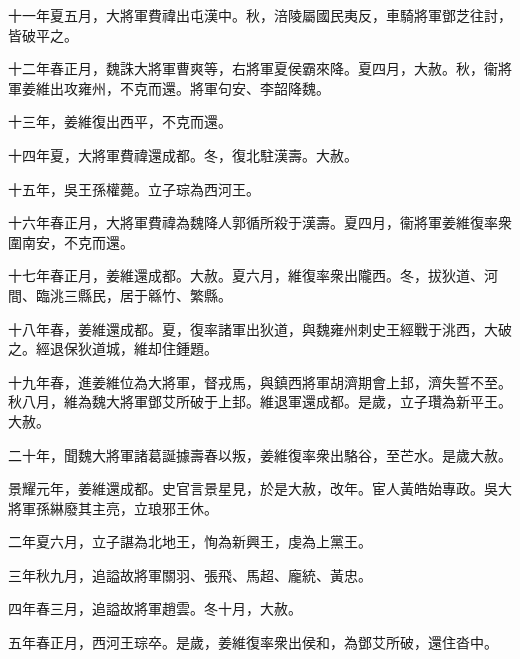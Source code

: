 \begin{pinyinscope}
 
 
 
 十一年夏五月，大將軍費禕出屯漢中。秋，涪陵屬國民夷反，車騎將軍鄧芝往討，皆破平之。
 
 
 
 
 十二年春正月，魏誅大將軍曹爽等，右將軍夏侯霸來降。夏四月，大赦。秋，衞將軍姜維出攻雍州，不克而還。將軍句安、李韶降魏。
 
 
 
 
 十三年，姜維復出西平，不克而還。
 
 
 
 
 十四年夏，大將軍費禕還成都。冬，復北駐漢壽。大赦。
 
 
 
 
 十五年，吳王孫權薨。立子琮為西河王。
 
 
 
 
 十六年春正月，大將軍費禕為魏降人郭循所殺于漢壽。夏四月，衞將軍姜維復率衆圍南安，不克而還。
 
 
 
 
 十七年春正月，姜維還成都。大赦。夏六月，維復率衆出隴西。冬，拔狄道、河間、臨洮三縣民，居于緜竹、繁縣。
 
 
 
 
 十八年春，姜維還成都。夏，復率諸軍出狄道，與魏雍州刺史王經戰于洮西，大破之。經退保狄道城，維却住鍾題。
 
 
 
 
 十九年春，進姜維位為大將軍，督戎馬，與鎮西將軍胡濟期會上邽，濟失誓不至。秋八月，維為魏大將軍鄧艾所破于上邽。維退軍還成都。是歲，立子瓚為新平王。大赦。
 
 
 
 
 二十年，聞魏大將軍諸葛誕據壽春以叛，姜維復率衆出駱谷，至芒水。是歲大赦。
 
 
 
 
 景耀元年，姜維還成都。史官言景星見，於是大赦，改年。宦人黃皓始專政。吳大將軍孫綝廢其主亮，立琅邪王休。
 
 
 
 
 二年夏六月，立子諶為北地王，恂為新興王，虔為上黨王。
 
 
 
 
 三年秋九月，追謚故將軍關羽、張飛、馬超、龐統、黃忠。
 
 
 
 
 四年春三月，追謚故將軍趙雲。冬十月，大赦。
 
 
 
 
 五年春正月，西河王琮卒。是歲，姜維復率衆出侯和，為鄧艾所破，還住沓中。
 

\end{pinyinscope}
